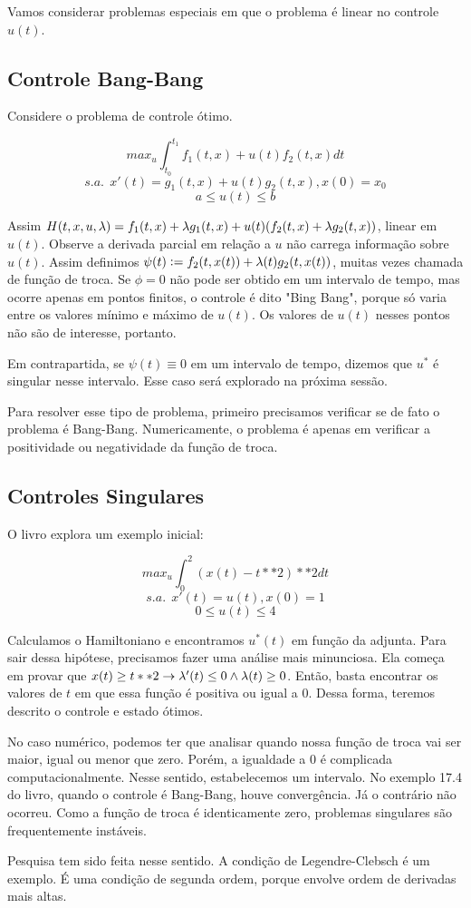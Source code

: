Vamos considerar problemas especiais em que o problema é linear 
no controle $u(t)$. 

\subsection{Controle Bang-Bang}

Considere o problema de controle ótimo.

$$max_u \int_{t_0}^{t_1} f_1(t,x) + u(t)f_2(t,x) dt$$
$$s.a.~~x'(t) = g_1(t,x) + u(t)g_2(t,x), x(0) = x_0$$
$$ a \leq u(t) \leq b$$

Assim $H(t,x,u,\lambda) = f_1(t,x) + \lambda g_1(t,x) + u(t)(f_2(t,x) + \lambda g_2(t,x))$, 
linear em $u(t)$. Observe a derivada parcial em relação a $u$ não
carrega informação sobre $u(t)$. Assim definimos $\psi(t) := f_2(t,x(t)) + \lambda(t)g_2(t,x(t))$,
muitas vezes chamada de função de troca. Se $\phi = 0$ não pode ser obtido 
em um intervalo de tempo, mas ocorre apenas em pontos finitos, o controle
é dito "Bing Bang", porque só varia entre os valores mínimo e máximo de $u(t)$. 
Os valores de $u(t)$ nesses pontos não são de interesse, portanto. 

Em contrapartida, se $\psi(t) \equiv 0$ em um intervalo de tempo, dizemos que $u^*$ é 
singular nesse intervalo. Esse caso será explorado na próxima sessão. 

Para resolver esse tipo de problema, primeiro precisamos verificar se de fato 
o problema é Bang-Bang. Numericamente, o problema é apenas em verificar a positividade
ou negatividade da função de troca. 

\subsection{Controles Singulares}

O livro explora um exemplo inicial:

$$max_u \int_0^2 (x(t) - t**2)**2 dt $$
$$s.a. ~~ x'(t) = u(t), x(0) = 1$$
$$0 \leq u(t) \leq 4$$

Calculamos o Hamiltoniano e encontramos $u^*(t)$ em função da adjunta. 
Para sair dessa hipótese, precisamos fazer uma análise mais minunciosa. 
Ela começa em provar que $x(t) \geq t**2 \rightarrow \lambda'(t) \leq 0 \wedge \lambda(t) \geq 0$. 
Então, basta encontrar os valores de $t$ em que essa função é positiva 
ou igual a $0$. Dessa forma, teremos descrito o controle e estado ótimos.

No caso numérico, podemos ter que analisar quando nossa função de troca vai ser 
maior, igual ou menor que zero. Porém, a igualdade a 0 é complicada computacionalmente. 
Nesse sentido, estabelecemos um intervalo. No exemplo 17.4 do livro, quando o controle é 
Bang-Bang, houve convergência. Já o contrário não ocorreu. Como a função de troca é 
identicamente zero, problemas singulares são frequentemente instáveis. 

Pesquisa tem sido feita nesse sentido. A condição de Legendre-Clebsch é um exemplo. É uma
condição de segunda ordem, porque envolve ordem de derivadas mais altas.